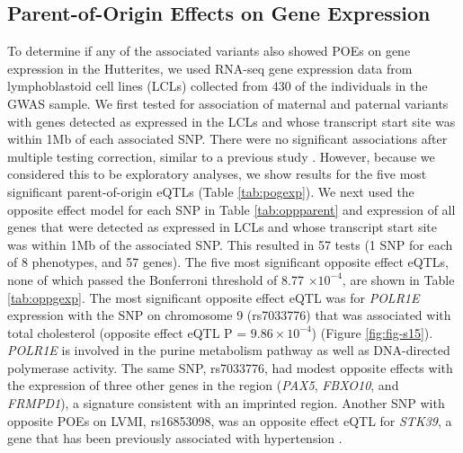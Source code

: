 \subsection{Parent-of-Origin Effects on Gene Expression}\label{Parent-of-Origin Effects on Gene Expression}

To determine if any of the associated variants also showed POEs on gene expression in the Hutterites, we used RNA-seq gene expression data from lymphoblastoid cell lines (LCLs) collected from 430 of the individuals in the GWAS sample. We first tested for association of maternal and paternal variants with genes detected as expressed in the LCLs and whose transcript start site was within 1Mb of each associated SNP. There were no significant associations after multiple testing correction, similar to a previous study \cite{Benonisdottir:2016dz}. However, because we considered this to be exploratory analyses, we show results for the five most significant parent-of-origin eQTLs (Table \ref{tab:pogexp}). We next used the opposite effect model for each SNP in Table \ref{tab:oppparent} and expression of all genes that were detected as expressed in LCLs and whose transcript start site was within 1Mb of the associated SNP. This resulted in 57 tests (1 SNP for each of 8 phenotypes, and 57 genes). The five most significant opposite effect eQTLs, none of which passed the Bonferroni threshold of 8.77 $\times 10^{-4} $, are shown in Table \ref{tab:oppgexp}. The most significant opposite effect eQTL was for \emph{POLR1E} expression with the SNP on chromosome 9 (rs7033776) that was associated with total cholesterol (opposite effect eQTL P = $9.86 \times10^{-4} $) (Figure \ref{fig:fig-s15}). \emph{POLR1E} is involved in the purine metabolism pathway as well as DNA-directed polymerase activity. The same SNP, rs7033776, had modest opposite effects with the expression of three other genes in the region (\emph{PAX5}, \emph{FBXO10}, and \emph{FRMPD1}), a signature consistent with an imprinted region. Another SNP with opposite POEs on LVMI, rs16853098, was an opposite effect eQTL for \emph{STK39}, a gene that has been previously associated with hypertension \cite{Wang:2009bt}.



